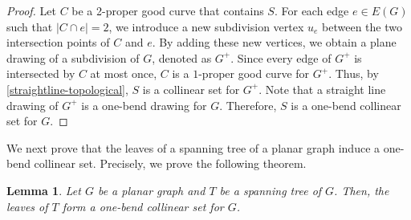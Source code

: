 \documentclass[11pt]{article}
\newtheorem{lem}{Lemma}
\theoremstyle{definition}
\begin{document}
\begin{proof}
Let $C$ be a 2-proper good curve that contains $S$. For each edge $e \in E(G)$ such that $|C \cap e| = 2$, we introduce a new subdivision vertex $u_e$ between the two intersection points of $C$ and $e$. By adding these new vertices, we obtain a plane drawing of a subdivision of $G$, denoted as $G^+$. Since every edge of $G^+$ is intersected by $C$ at most once, $C$ is a $1$-proper good curve for $G^+$. Thus, by \cref{straightline-topological}, $S$ is a collinear set for $G^+$. Note that a straight line drawing of $G^+$ is a one-bend drawing for $G$. Therefore, $S$ is a one-bend collinear set for $G$.
\end{proof}


We next prove that the leaves of a spanning tree of a planar graph induce a one-bend collinear set. Precisely, we prove the following theorem.

\begin{lem} \label{spanning_tree_to_collinear_set}
  Let $G$ be a planar graph and $T$ be a spanning tree of $G$. Then, the leaves of $T$ form a one-bend collinear set for $G$.
\end{lem}
\end{document}
